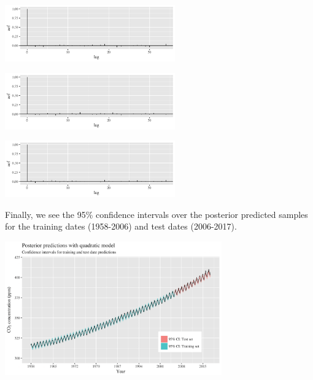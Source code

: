 \documentclass[]{article}
\let\origfigure=\figure
\let\endorigfigure=\endfigure
\renewenvironment{figure}[1][]{%
  \origfigure[H]
}{%
  \endorigfigure
}
\begin{document}
\begin{figure}
\centering
\includegraphics[width=0.55\textwidth]{mauna_loa/auto4.png}
\caption{``Autocorrelation of A samples''}
\end{figure}

\begin{figure}
\centering
\includegraphics[width=0.55\textwidth]{mauna_loa/auto5.png}
\caption{Autocorrelation of phi samples}
\end{figure}

\begin{figure}
\centering
\includegraphics[width=0.55\textwidth]{mauna_loa/auto6.png}
\caption{Autocorrelation of sigma samples}
\end{figure}

Finally, we see the 95\% confidence intervals over the posterior
predicted samples for the training dates (1958-2006) and test dates
(2006-2017).

\begin{figure}
\centering
\includegraphics[width=0.7\textwidth]{mauna_loa/quad_intervals.png}
\caption{Quadratic model posterior sampling}
\end{figure}
\end{document}
